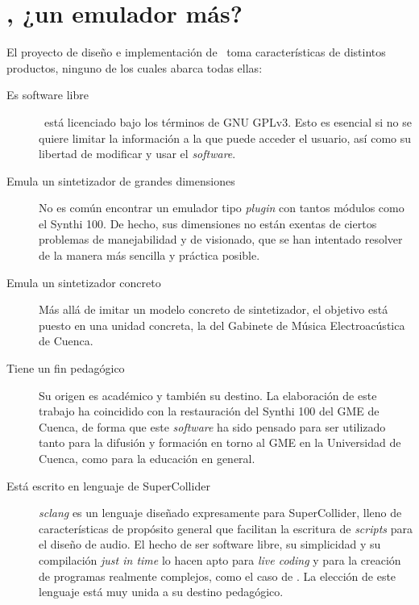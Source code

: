 \section[\appName, ¿un emulador más?]{\appName, ¿un emulador más?}

El proyecto de diseño e implementación de \appName~toma características de distintos productos, ninguno de los cuales abarca todas ellas:

\begin{description}
	\item[Es software libre] \appName~está licenciado bajo los términos de GNU GPLv3. Esto es esencial si no se quiere limitar la información a la que puede acceder el usuario, así como su libertad de modificar y usar el \textit{software}. 
	
	\item[Emula un sintetizador de grandes dimensiones] No es común encontrar un emulador tipo \textit{plugin} con tantos módulos como el Synthi 100. De hecho, sus dimensiones no están exentas de ciertos problemas de manejabilidad y de visionado, que se han intentado resolver de la manera más sencilla y práctica posible.
	
	\item[Emula un sintetizador concreto] Más allá de imitar un modelo concreto de sintetizador, el objetivo está puesto en una unidad concreta, la del Gabinete de Música Electroacústica de Cuenca. 
	
	\item[Tiene un fin pedagógico] Su origen es académico y también su destino. La elaboración de este trabajo ha coincidido con la restauración del Synthi 100 del GME de Cuenca, de forma que este \textit{software} ha sido pensado para ser utilizado tanto para la difusión y formación en torno al GME en la Universidad de Cuenca, como para la educación en general. 
	
	\item[Está escrito en lenguaje de SuperCollider] \textit{sclang} es un lenguaje diseñado expresamente para SuperCollider, lleno de características de propósito general que facilitan la escritura de \textit{scripts} para el diseño de audio. El hecho de ser software libre, su simplicidad y su  compilación \textit{just in time} lo hacen apto para \textit{live coding} y para la creación de programas realmente complejos, como el caso de \appName. La elección de este lenguaje está muy unida a su destino pedagógico.
\end{description}



